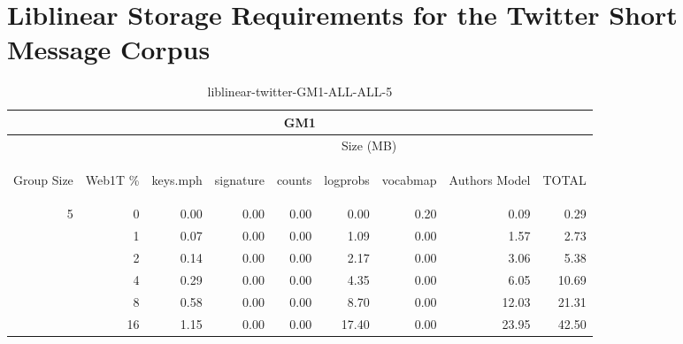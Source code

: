 \chapter{Liblinear Storage Requirements for the Twitter Short Message Corpus}

\begin{center}
\begin{table}[htbp] 
 \begin{center}
\begin{tabular}{ | r | r | r | r | r | r | r | r | r |}
\hline
\multicolumn{9}{|c|}{GM1}\\
\hline
 & & \multicolumn{7}{|c|}{Size (MB)}\\ \cline{3-9}
\begin{sideways}Group Size\end{sideways} & \begin{sideways}Web1T \% \end{sideways} & \begin{sideways}keys.mph\end{sideways} & \begin{sideways}signature\end{sideways} & \begin{sideways}counts\end{sideways} & \begin{sideways}logprobs\end{sideways} & \begin{sideways}vocabmap\end{sideways} & \begin{sideways}Authors Model \end{sideways} & \begin{sideways}TOTAL\end{sideways}\\
\hline
\multirow{5}{*}{5}
 & 0 & 0.00 & 0.00 & 0.00 & 0.00 & 0.20 & 0.09 & 0.29\\ \cline{2-9}
 & 1 & 0.07 & 0.00 & 0.00 & 1.09 & 0.00 & 1.57 & 2.73\\ \cline{2-9}
 & 2 & 0.14 & 0.00 & 0.00 & 2.17 & 0.00 & 3.06 & 5.38\\ \cline{2-9}
 & 4 & 0.29 & 0.00 & 0.00 & 4.35 & 0.00 & 6.05 & 10.69\\ \cline{2-9}
 & 8 & 0.58 & 0.00 & 0.00 & 8.70 & 0.00 & 12.03 & 21.31\\ \cline{2-9}
 & 16 & 1.15 & 0.00 & 0.00 & 17.40 & 0.00 & 23.95 & 42.50\\ \cline{2-9}
\hline
\end{tabular}
\caption{liblinear-twitter-GM1-ALL-ALL-5}
\label{table:liblinear-twitter-GM1-ALL-ALL-5}
\end{center}
 \end{table}
\end{center}

